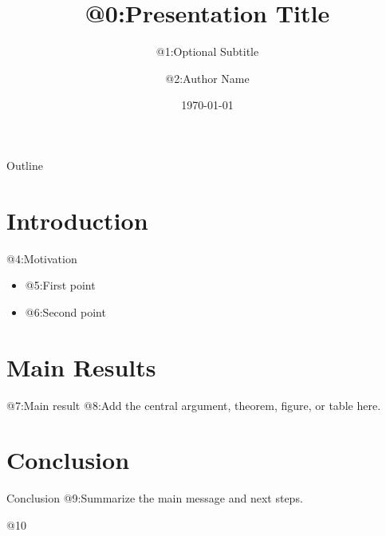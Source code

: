 \documentclass[aspectratio=169]{beamer}
\title{@{0:Presentation Title}}
\subtitle{@{1:Optional Subtitle}}
\author{@{2:Author Name}}
\institute{@{3:Affiliation}}
\date{\today}
\theoremstyle{plain}
\theoremstyle{definition}
\theoremstyle{example}
\theoremstyle{remark}
\begin{document}
\begin{frame}
  \titlepage
\end{frame}

\begin{frame}{Outline}
  \tableofcontents
\end{frame}

\section{Introduction}

\begin{frame}{@{4:Motivation}}
  \begin{itemize}
    \item @{5:First point}
    \item @{6:Second point}
  \end{itemize}
\end{frame}

\section{Main Results}

\begin{frame}{@{7:Main result}}
  @{8:Add the central argument, theorem, figure, or table here.}
\end{frame}

\section{Conclusion}

\begin{frame}{Conclusion}
  @{9:Summarize the main message and next steps.}
\end{frame}

@10
\end{document}
